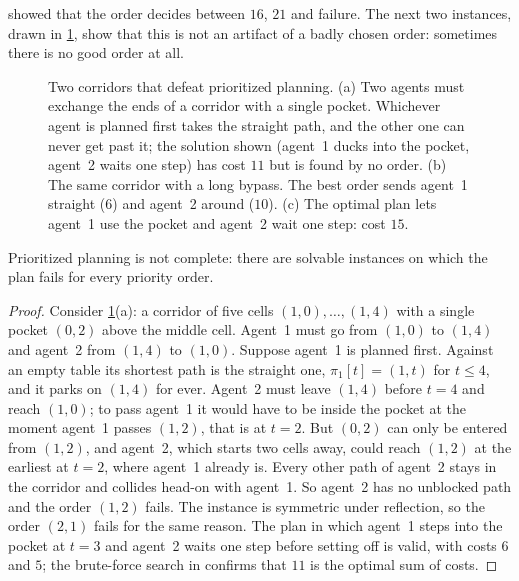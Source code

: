  showed that the order decides between $16$, $21$ and failure.
The next two instances, drawn in \cref{fig:ch08-counterexamples}, show that this is
not an artifact of a badly chosen order: sometimes there is no good order at all.

\begin{figure}[tb]
  \centering
  \caption{Two corridors that defeat prioritized planning. (a) Two agents must exchange
  the ends of a corridor with a single pocket. Whichever agent is planned first takes
  the straight path, and the other one can never get past it; the solution shown
  (agent~1 ducks into the pocket, agent~2 waits one step) has cost $11$ but is found by
  no order. (b) The same corridor with a long bypass. The best order sends agent~1
  straight ($6$) and agent~2 around ($10$). (c) The optimal plan lets agent~1 use the
  pocket and agent~2 wait one step: cost $15$.}
  \label{fig:ch08-counterexamples}
\end{figure}

\begin{proposition}[Incompleteness]
\label{thm:ch08-incomplete}
Prioritized planning is not complete: there are solvable instances on which the plan
fails for every priority order.
\end{proposition}
\begin{proof}
Consider \cref{fig:ch08-counterexamples}(a): a corridor of five cells $(1,0), \dots,
(1,4)$ with a single pocket $(0,2)$ above the middle cell. Agent~1 must go from
$(1,0)$ to $(1,4)$ and agent~2 from $(1,4)$ to $(1,0)$. Suppose agent~1 is planned
first. Against an empty table its shortest path is the straight one, $\pi_1[t] = (1,t)$
for $t \le 4$, and it parks on $(1,4)$ for ever. Agent~2 must leave $(1,4)$ before
$t = 4$ and reach $(1,0)$; to pass agent~1 it would have to be inside the pocket at
the moment agent~1 passes $(1,2)$, that is at $t = 2$. But $(0,2)$ can only be entered
from $(1,2)$, and agent~2, which starts two cells away, could reach $(1,2)$ at the
earliest at $t = 2$, where agent~1 already is. Every other path of agent~2 stays in the
corridor and collides head-on with agent~1. So agent~2 has no unblocked path and the
order $(1,2)$ fails. The instance is symmetric under reflection, so the order $(2,1)$
fails for the same reason. The plan in which agent~1 steps into the pocket at $t = 3$
and agent~2 waits one step before setting off is valid, with costs $6$ and $5$; the
brute-force search in  confirms that $11$ is the
optimal sum of costs. \qedhere
\end{proof}

